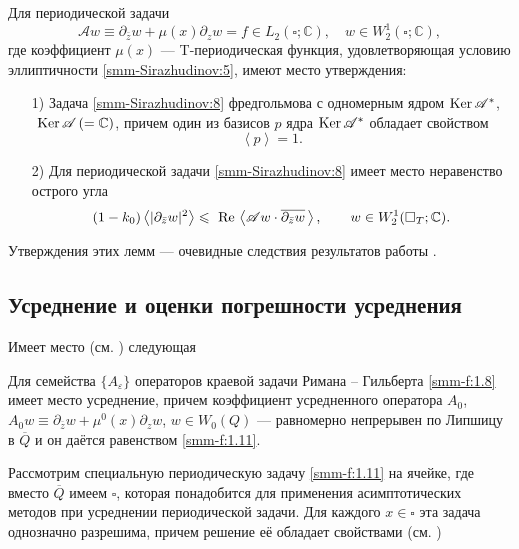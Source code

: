 \begin{lemma}
	Для периодической задачи
	\begin{equation}\label{smm-Sirazhudinov:8}
		\mathscr{A}w\equiv \partial_{\bar{z}}w +\mu(x) \partial_{z}w =f\in L_2(\square;\mathbb{C}),\quad
		w\in W_2^1(\square;\mathbb{C}),
	\end{equation}
	где коэффициент $\mu(x)$  --- {T}-периодическая функция, удовлетворяющая условию эллиптичности \eqref{smm-Sirazhudinov:5}, имеют место  утверждения:
	\begin{enumerate}
		\item[1)] Задача  \eqref{smm-Sirazhudinov:8} фредгольмова с одномерным ядром $\text{Ker\,}\mathscr{A}^\ast$, $\text{ Ker\,}\mathscr{A}\,(=\mathbb{C})$,
		причем один из базисов $p$ ядра
		$\text{Ker\,}\mathscr{A}^\ast$ обладает свойством
		\begin{equation*}%
			\left< p\right>=1.
		\end{equation*}
		\item[2)] Для периодической задачи \eqref{smm-Sirazhudinov:8} имеет место неравенство острого угла
		\begin{equation}\label{smm-Sirazhudinov:9}
			(1-k_0)\left<|\partial_{\bar{z}}w|^2\right>\leqslant \text{ Re\,}
			\left<\mathscr{A} w\cdot \overline{\partial_{\bar{z}}w}\,\right>,\qquad
			w \in W_2^1(\square_T;\mathbb{C}).
		\end{equation}
	\end{enumerate}
\end{lemma}
Утверждения этих лемм --- очевидные следствия результатов работы \cite{smm-10}.


\subsection{Усреднение и оценки погрешности усреднения}

Имеет место (см. \cite{smm-10})  следующая
	
\begin{theorem}[Об усреднении]
 Для семейства $\{A_\varepsilon\}$ операторов краевой
		задачи Римана -- Гильберта \eqref{smm-f:1.8} имеет место усреднение, причем коэффициент
		усредненного оператора $A_0$, $A_0w\equiv\partial_{\overline{z}}w+\mu^0(x)\partial_zw$, $w\in W_0(Q)$ --- равномерно непрерывен  по Липшицу в $\overline{Q}$ и он даётся равенством \eqref{smm-f:1.11}.
\end{theorem}

Рассмотрим специальную периодическую задачу \eqref{smm-f:1.11} на ячейке, где вместо $\overline{Q}$ имеем $\square$,  которая понадобится для применения асимптотических методов при усреднении периодической задачи. Для каждого $x\in\square$ эта задача однозначно разрешима, причем решение её обладает свойствами (см. \cite{smm-10})

